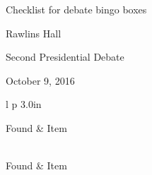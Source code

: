 \documentclass[12pt]{article}
\newcommand{\sep}{1mm}
\newcommand{\negsep}{-3mm}
\begin{document}
\begin{center}
\begin{Large}
Checklist for debate bingo boxes
\end{Large}
\vspace{0.15in}

Rawlins Hall

Second Presidential Debate

October 9, 2016

\end{center}

\begin{longtable}{l p {3.0in} }

Found  & Item \\[\sep]
\hline\\[\negsep]
\endfirsthead

Found  & Item \\[\sep]
\hline\\[\negsep]
\endhead

\hline\hline
\endfoot



\end{longtable}
\end{document}

